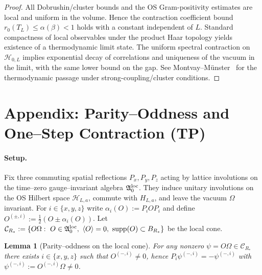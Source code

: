 \documentclass[11pt]{amsart}
\theoremstyle{plain}
\newtheorem{lemma}[theorem]{Lemma}
\theoremstyle{definition}
\theoremstyle{remark}
\begin{document}
\begin{proof}
All Dobrushin/cluster bounds and the OS Gram-positivity estimates are local and uniform in the volume. Hence the contraction coefficient bound $r_0(T_L)\le \alpha(\beta)<1$ holds with a constant independent of $L$. Standard compactness of local observables under the product Haar topology yields existence of a thermodynamic limit state. The uniform spectral contraction on $\mathcal H_{0,L}$ implies exponential decay of correlations and uniqueness of the vacuum in the limit, with the same lower bound on the gap. See Montvay--M\"unster~\cite{MontvayMunster1994} for the thermodynamic passage under strong-coupling/cluster conditions.
\end{proof}

\section{Appendix: Parity--Oddness and One--Step Contraction (TP)}

\paragraph{Setup.}
Fix three commuting spatial reflections $P_x,P_y,P_z$ acting by lattice involutions on the time--zero gauge--invariant algebra $\mathfrak{A}_0^{\rm loc}$. They induce unitary involutions on the OS Hilbert space $\mathcal{H}_{L,a}$, commute with $H_{L,a}$, and leave the vacuum $\Omega$ invariant. For $i\in\{x,y,z\}$ write $\alpha_i(O):=P_i O P_i$ and define $O^{(\pm,i)}:=\tfrac12(O\pm\alpha_i(O))$. Let $\mathcal{C}_{R_*}:=\{O\Omega:\ O\in\mathfrak{A}_0^{\rm loc},\ \langle O\rangle=0,\ \mathrm{supp}(O)\subset B_{R_*}\}$ be the local cone.

\begin{lemma}[Parity--oddness on the local cone]\label{lem:oddness-tp}
For any nonzero $\psi=O\Omega\in\mathcal{C}_{R_*}$ there exists $i\in\{x,y,z\}$ such that $O^{(-,i)}\neq 0$, hence $P_i\psi^{(-,i)}=-\psi^{(-,i)}$ with $\psi^{(-,i)}:=O^{(-,i)}\Omega\neq 0$.
\end{lemma}
\end{document}
